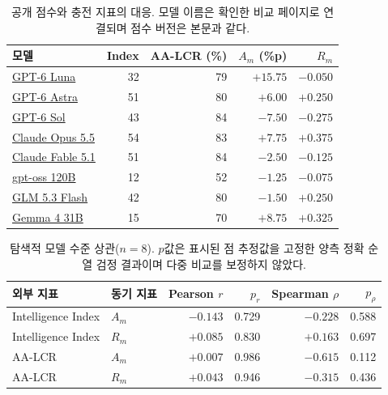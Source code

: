 \begin{table}[!t]
\centering\footnotesize
\caption{공개 점수와 충전 지표의 대응. 모델 이름은 확인한 비교 페이지로 연결되며 점수 버전은 본문과 같다.}
\label{tab:capability-inputs}
\begin{tabular}{@{}lrrrr@{}}
\toprule
모델 & Index & AA-LCR (\%) & $A_m$ (\%p) & $R_m$ \\
\midrule
\href{https://artificialanalysis.ai/models/comparisons/gpt-6-luna-high-vs-gpt-6-sol-high}{GPT-6 Luna} & 32 & 79 & $+15.75$ & $-0.050$ \\
\href{https://artificialanalysis.ai/models/comparisons/gpt-6-astra-high-vs-gpt-oss-120b}{GPT-6 Astra} & 51 & 80 & $+6.00$ & $+0.250$ \\
\href{https://artificialanalysis.ai/models/comparisons/gpt-6-luna-high-vs-gpt-6-sol-high}{GPT-6 Sol} & 43 & 84 & $-7.50$ & $-0.275$ \\
\href{https://artificialanalysis.ai/models/comparisons/claude-opus-5-5-high-vs-gpt-oss-120b}{Claude Opus 5.5} & 54 & 83 & $+7.75$ & $+0.375$ \\
\href{https://artificialanalysis.ai/models/comparisons/claude-fable-5-1-high-vs-gpt-oss-120b}{Claude Fable 5.1} & 51 & 84 & $-2.50$ & $-0.125$ \\
\href{https://artificialanalysis.ai/models/comparisons/gemma-4-31b-vs-gpt-oss-120b}{gpt-oss 120B} & 12 & 52 & $-1.25$ & $-0.075$ \\
\href{https://artificialanalysis.ai/models/comparisons/glm-5-3-flash-vs-gpt-oss-120b}{GLM 5.3 Flash} & 42 & 80 & $-1.50$ & $+0.250$ \\
\href{https://artificialanalysis.ai/models/comparisons/gemma-4-31b-vs-gpt-oss-120b}{Gemma 4 31B} & 15 & 70 & $+8.75$ & $+0.325$ \\
\bottomrule
\end{tabular}
\end{table}

\begin{table}[!t]
\centering\footnotesize
\caption{탐색적 모델 수준 상관($n=8$). $p$값은 표시된 점 추정값을 고정한 양측 정확 순열 검정 결과이며 다중 비교를 보정하지 않았다.}
\label{tab:capability-correlations}
\begin{tabular}{@{}llrrrr@{}}
\toprule
외부 지표 & 동기 지표 & Pearson $r$ & $p_r$ & Spearman $\rho$ & $p_\rho$ \\
\midrule
Intelligence Index & $A_m$ & $-0.143$ & 0.729 & $-0.228$ & 0.588 \\
Intelligence Index & $R_m$ & $+0.085$ & 0.830 & $+0.163$ & 0.697 \\
AA-LCR & $A_m$ & $+0.007$ & 0.986 & $-0.615$ & 0.112 \\
AA-LCR & $R_m$ & $+0.043$ & 0.946 & $-0.315$ & 0.436 \\
\bottomrule
\end{tabular}
\end{table}

